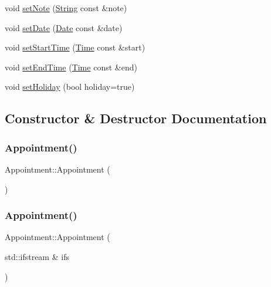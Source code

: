 \begin{DoxyCompactItemize}
\item 
void \hyperlink{classAppointment_a367bc61167a71691ba150808968f3b8c}{set\+Note} (\hyperlink{classString}{String} const \&note)
\item 
void \hyperlink{classAppointment_a0a69e652f7d3fa5091330a92479749a6}{set\+Date} (\hyperlink{classDate}{Date} const \&date)
\item 
void \hyperlink{classAppointment_ae0e33915a3e3d3af95c7e6180809e5fe}{set\+Start\+Time} (\hyperlink{classTime}{Time} const \&start)
\item 
void \hyperlink{classAppointment_a9e6455381eebacbaa3aa98ad3707baac}{set\+End\+Time} (\hyperlink{classTime}{Time} const \&end)
\item 
void \hyperlink{classAppointment_acd825ab9b1d23efe1bc95dd440030094}{set\+Holiday} (bool holiday=true)
\end{DoxyCompactItemize}


\subsection{Constructor \& Destructor Documentation}
\mbox{\label{classAppointment_a6f5ebbe07e02feaab6600c0f6297e694}} 
\subsubsection{\texorpdfstring{Appointment()}{Appointment()}\hspace{0.1cm}{\footnotesize\ttfamily [1/3]}}
{\footnotesize\ttfamily Appointment\+::\+Appointment (\begin{DoxyParamCaption}{ }\end{DoxyParamCaption})\hspace{0.3cm}{\ttfamily [inline]}}

\mbox{\label{classAppointment_a3b5b82331c630dcce3b1e724d0e6c48e}} 
\subsubsection{\texorpdfstring{Appointment()}{Appointment()}\hspace{0.1cm}{\footnotesize\ttfamily [2/3]}}
{\footnotesize\ttfamily Appointment\+::\+Appointment (\begin{DoxyParamCaption}\item[{std\+::ifstream \&}]{ifs }\end{DoxyParamCaption})}

